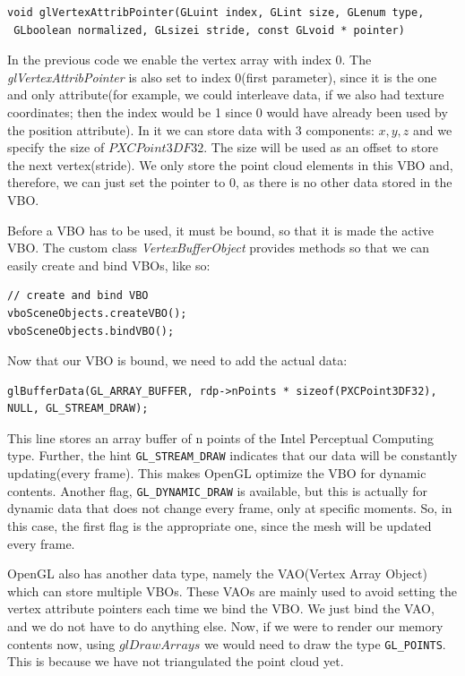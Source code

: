 \documentclass[]{article}
\begin{document}
\begin{verbatim}
void glVertexAttribPointer(GLuint index​, GLint size​, GLenum type,
 GLboolean normalized​, GLsizei stride​, const GLvoid * pointer​)
\end{verbatim}

In the previous code we enable the vertex array with index 0. The \textit{glVertexAttribPointer} is also set to  index 0(first parameter), since it is the one and only attribute(for example, we could interleave data, if we also had texture coordinates; then the index would be 1 since 0 would have already been used by the position attribute). In it we can store data with 3 components: $x,y,z$ and we specify the size of $PXCPoint3DF32$. The size will be used as an offset to store the next vertex(stride). We only store the point cloud elements in this VBO and, therefore, we can just set the pointer to 0, as there is no other data stored in the VBO.

Before a VBO has to be used, it must be bound, so that it is made the active VBO. The custom class \textit{VertexBufferObject} provides methods so that we can easily create and bind VBOs, like so:
\begin{verbatim}
// create and bind VBO
vboSceneObjects.createVBO();
vboSceneObjects.bindVBO();
\end{verbatim}

Now that our VBO is bound, we need to add the actual data:

\begin{verbatim}
glBufferData(GL_ARRAY_BUFFER, rdp->nPoints * sizeof(PXCPoint3DF32), 
NULL, GL_STREAM_DRAW);
\end{verbatim}

This line stores an array buffer of n points of the Intel Perceptual Computing type. Further, the hint \verb|GL_STREAM_DRAW| indicates that our data will be constantly updating(every frame). This makes OpenGL optimize the VBO for dynamic contents. Another flag, \verb|GL_DYNAMIC_DRAW| is available, but this is actually for dynamic data that does not change every frame, only at specific moments. So, in this case, the first flag is the appropriate one, since the mesh will be updated every frame.

OpenGL also has another data type, namely the VAO(Vertex Array Object) which can store multiple VBOs. These VAOs are mainly used to avoid setting the vertex attribute pointers each time we bind the VBO. We just bind the VAO, and we do not have to do anything else. Now, if we were to render our memory contents now, using $glDrawArrays$ we would need to draw the type \verb|GL_POINTS|. This is because we have not triangulated the point cloud yet.
\end{document}
